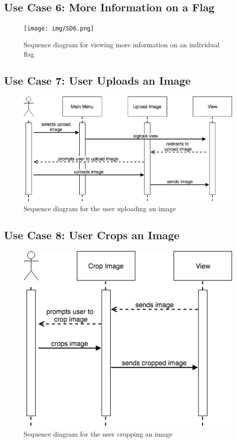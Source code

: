 \documentclass[12pt,fleqn]{article}
\begin{document}
\subsection{Use Case 6: More Information on a Flag}
\begin{figure}[H]
    \centering
    \texttt{[image: img/SD6.png]}
    \caption{Sequence diagram for viewing more information on an individual flag}
\end{figure}

\subsection{Use Case 7: User Uploads an Image}
\begin{figure}[H]
    \centering
    \includegraphics[scale=0.6]{img/SD7.png}
    \caption{Sequence diagram for the user uploading an image}
\end{figure}

\subsection{Use Case 8: User Crops an Image}
\begin{figure}[H]
    \centering
    \includegraphics[scale=0.6]{img/SD8.png}
    \caption{Sequence diagram for the user cropping an image}
\end{figure}
\end{document}
